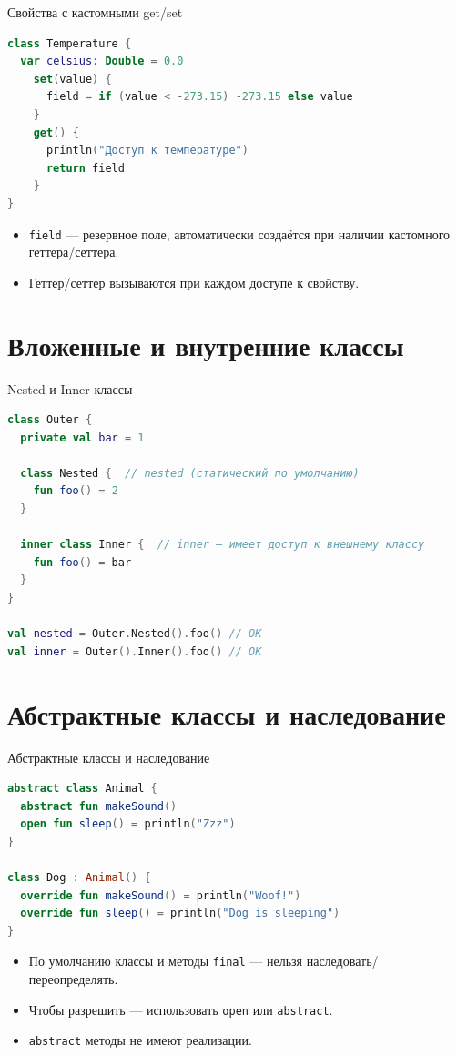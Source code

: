 \documentclass[aspectratio=169]{beamer}
\begin{document}
\begin{frame}[fragile]{Свойства с кастомными get/set}
  \begin{lstlisting}[language=Kotlin]
class Temperature {
  var celsius: Double = 0.0
    set(value) {
      field = if (value < -273.15) -273.15 else value
    }
    get() {
      println("Доступ к температуре")
      return field
    }
}
  \end{lstlisting}
  \begin{itemize}
    \item \texttt{field} — резервное поле, автоматически создаётся при наличии кастомного геттера/сеттера.
    \item Геттер/сеттер вызываются при каждом доступе к свойству.
  \end{itemize}
\end{frame}

\section{Вложенные и внутренние классы}

\begin{frame}[fragile]{Nested и Inner классы}
  \begin{lstlisting}[language=Kotlin]
class Outer {
  private val bar = 1

  class Nested {  // nested (статический по умолчанию)
    fun foo() = 2
  }

  inner class Inner {  // inner — имеет доступ к внешнему классу
    fun foo() = bar
  }
}

val nested = Outer.Nested().foo() // OK
val inner = Outer().Inner().foo() // OK
  \end{lstlisting}
\end{frame}

\section{Абстрактные классы и наследование}

\begin{frame}[fragile]{Абстрактные классы и наследование}
  \begin{lstlisting}[language=Kotlin]
abstract class Animal {
  abstract fun makeSound()
  open fun sleep() = println("Zzz")
}

class Dog : Animal() {
  override fun makeSound() = println("Woof!")
  override fun sleep() = println("Dog is sleeping")
}
  \end{lstlisting}
  \begin{itemize}
    \item По умолчанию классы и методы \texttt{final} — нельзя наследовать/переопределять.
    \item Чтобы разрешить — использовать \texttt{open} или \texttt{abstract}.
    \item \texttt{abstract} методы не имеют реализации.
  \end{itemize}
\end{frame}
\end{document}
